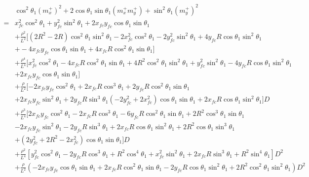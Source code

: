 \documentclass[12pt]{article}
\begin{document}
\begin{align}
    &\cos^2\theta_1(m_x^+)^2  + 2\cos\theta_1\sin\theta_1(m_x^+m_y^+)  +\sin^2\theta_1(m_y^+)^2 \\
    =& x_{fc}^2\cos^2\theta_1  + y_{fc}^2\sin^2\theta_1 + 2x_{fc}y_{fc}\cos\theta_1\sin\theta_1   \nonumber\\
    &+ \frac{\rho^2}{L^2}[(2R^2-2R)\cos^2\theta_1\sin^2\theta_1 -2x_{fc}^2\cos^2\theta_1 -2y_{fc}^2\sin^2\theta_1 + 4y_{fc}R\cos\theta_1\sin^2\theta_1 \nonumber\\
    &+ -4x_{fc}y_{fc}\cos\theta_1\sin\theta_1 +4x_{fc}R\cos^2\theta_1\sin\theta_1] \nonumber\\
    &+ \frac{\rho^4}{L^4}[x_{fc}^2\cos^2\theta_1 - 4x_{fc}R\cos^2\theta_1\sin\theta_1 + 4R^2\cos^2\theta_1\sin^2\theta_1 + y_{fc}^2\sin^2\theta_1 -4y_{fc}R\cos\theta_1\sin^2\theta_1 \nonumber\\
    &+ 2x_{fc}y_{fc}\cos\theta_1\sin\theta_1 ] \nonumber\\
    &+ \frac{\rho}{L^2}[-2x_{fc}y_{fc}\cos^2\theta_1 +2x_{fc}R\cos^3\theta_1 +2y_{fc}R\cos^2\theta_1\sin\theta_1 \nonumber\\
    &+ 2x_{fc}y_{fc}\sin^2\theta_1 + 2y_{fc}R\sin^3\theta_1 (-2y_{fc}^2 + 2x_{fc}^2)\cos\theta_1\sin\theta_1 + 2x_{fc}R\cos\theta_1\sin^2\theta_1 ]D \nonumber\\
    &+ \frac{\rho^3}{L^4}[2x_{fc}y_{fc}\cos^2\theta_1 -2x_{fc}R\cos^3\theta_1 -6y_{fc}R\cos^2\theta_1\sin\theta_1 +2R^2\cos^3\theta_1\sin\theta_1  \nonumber\\
    &- 2x_{fc}y_{fc}\sin^2\theta_1 - 2y_{fc}R\sin^3\theta_1 + 2x_{fc}R\cos\theta_1\sin^2\theta_1 + 2R^2\cos\theta_1\sin^3\theta_1 \nonumber\\
    &+  (2y_{fc}^2 +2R^2 -2x_{fc}^2)\cos\theta_1\sin\theta_1  ]D \nonumber\\
    &+ \frac{\rho^2}{L^4}[y_{fc}^2\cos^2\theta_1 -2y_{fc}R\cos^3\theta_1 +R^2\cos^4\theta_1 + x_{fc}^2\sin^2\theta_1 + 2x_{fc}R\sin^3\theta_1 + R^2\sin^4\theta_1]D^2 \nonumber\\
    &+ \frac{\rho}{L^2}(-2x_{fc}y_{fc}\cos\theta_1\sin\theta_1 + 2x_{fc}R\cos^2\theta_1\sin\theta_1 -2y_{fc}R\cos\theta_1\sin^2\theta_1 +  2R^2\cos^2\theta_1\sin^2\theta_1 )D^2
\end{align}
\end{document}
